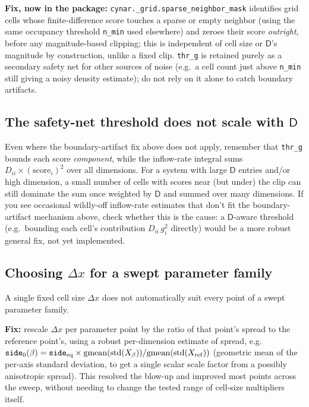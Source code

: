 \documentclass[11pt]{article}
\newcommand{\MD}{{\mathsf{D}}}
\begin{document}
\textbf{Fix, now in the package:} \texttt{cynar.\_grid.sparse\_neighbor\_mask} identifies grid cells whose finite-difference score touches a sparse or empty neighbor (using the same occupancy threshold \texttt{n\_min} used elsewhere) and zeroes their score \emph{outright}, before any magnitude-based clipping; this is independent of cell size or $\MD$'s magnitude by construction, unlike a fixed clip. \texttt{thr\_g} is retained purely as a secondary safety net for other sources of noise (e.g.\ a cell count just above \texttt{n\_min} still giving a noisy density estimate); do not rely on it alone to catch boundary artifacts.

\subsection{The safety-net threshold does not scale with $\MD$}

Even where the boundary-artifact fix above does not apply, remember that \texttt{thr\_g} bounds each score \emph{component}, while the inflow-rate integral sums $D_{ii}\times(\text{score}_i)^2$ over all dimensions. For a system with large $\MD$ entries and/or high dimension, a small number of cells with scores near (but under) the clip can still dominate the sum once weighted by $\MD$ and summed over many dimensions. If you see occasional wildly-off inflow-rate estimates that don't fit the boundary-artifact mechanism above, check whether this is the cause: a $\MD$-aware threshold (e.g.\ bounding each cell's contribution $D_{ii}\,g_i^2$ directly) would be a more robust general fix, not yet implemented.

\subsection{Choosing $\Delta x$ for a swept parameter family}
\label{sec:dx-family}

A single fixed cell size $\Delta x$ does not automatically suit every point of a swept parameter family. 

\textbf{Fix:} rescale $\Delta x$ per parameter point by the ratio of that point's spread to the reference point's, using a robust per-dimension estimate of spread, e.g.\\ $\texttt{side}_0(\beta) = \texttt{side}_{\rm eq}\times\mathrm{gmean}(\mathrm{std}(X_\beta))/\mathrm{gmean}(\mathrm{std}(X_{\rm ref}))$ (geometric mean of the per-axis standard deviation, to get a single scalar scale factor from a possibly anisotropic spread). This resolved the blow-up and improved most points across the sweep, without needing to change the tested range of cell-size multipliers itself. 
\end{document}
